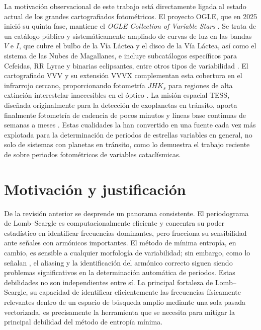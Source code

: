 \documentclass[12pt,letterpaper,oneside]{book}
\begin{document}
La motivaci\'on observacional de este trabajo est\'a directamente ligada al estado actual de los grandes cartografiados fotom\'etricos. El proyecto OGLE, que en 2025 inici\'o su quinta fase, mantiene el \emph{OGLE Collection of Variable Stars} \citep{iwanek_2025,soszynski_2024}. Se trata de un cat\'alogo p\'ublico y sistem\'aticamente ampliado de curvas de luz en las bandas $V$ e $I$, que cubre el bulbo de la V\'ia L\'actea y el disco de la V\'ia L\'actea, as\'i como el sistema de las Nubes de Magallanes, e incluye subcat\'alogos espec\'ificos para Cefeidas, RR Lyrae y binarias eclipsantes, entre otros tipos de variabilidad \citep{Soszynski2008,Soszynski2009,Soszynski2010,Soszynski2010b,Soszynski2011,Soszynski2011b,Soszynski2014,Soszynski2016,pawlak2016,pietrukowicz2013b}. El cartografiado VVV y su extensi\'on VVVX complementan esta cobertura en el infrarrojo cercano, proporcionando fotometr\'ia $JHK_s$ para regiones de alta extinci\'on interestelar inaccesibles en el \'optico \citep{vvv_survey,saito_2024}. La misi\'on espacial TESS, dise\~nada originalmente para la detecci\'on de exoplanetas en tr\'ansito, aporta finalmente fotometr\'ia de cadencia de pocos minutos y l\'ineas base continuas de semanas a meses \citep{ricker_2015}. Estas cualidades la han convertido en una fuente cada vez m\'as explotada para la determinaci\'on de periodos de estrellas variables en general, no solo de sistemas con planetas en tr\'ansito, como lo demuestra el trabajo reciente de \citet{kepler_2026} sobre periodos fotom\'etricos de variables catacl\'ismicas.

\section{Motivaci\'on y justificaci\'on}
\label{sec:motivacion}

De la revisi\'on anterior se desprende un panorama consistente. El periodograma de Lomb--Scargle es computacionalmente eficiente y concentra su poder estad\'istico en identificar frecuencias dominantes, pero fracciona su sensibilidad ante se\~nales con arm\'onicos importantes. El m\'etodo de m\'inima entrop\'ia, en cambio, es sensible a cualquier morfolog\'ia de variabilidad; sin embargo, como lo se\~nalan \citet{Graham2013}, el aliasing y la identificaci\'on del arm\'onico correcto siguen siendo problemas significativos en la determinaci\'on autom\'atica de periodos. Estas debilidades no son independientes entre s\'i. La principal fortaleza de Lomb--Scargle, su capacidad de identificar eficientemente las frecuencias f\'isicamente relevantes dentro de un espacio de b\'usqueda amplio mediante una sola pasada vectorizada, es precisamente la herramienta que se necesita para mitigar la principal debilidad del m\'etodo de entrop\'ia m\'inima.
\end{document}
